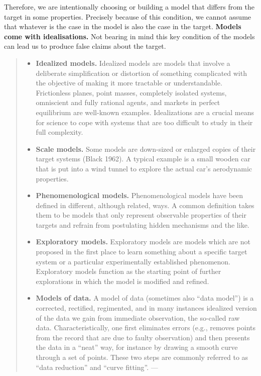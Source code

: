 \documentclass[
  12pt,
]{book}
\providecommand{\tightlist}{%
  \setlength{\itemsep}{0pt}\setlength{\parskip}{0pt}}
\begin{document}
Therefore, we are intentionally choosing or building a model that differs from the target in some properties. Precisely because of this condition, we cannot assume that whatever is the case in the model is also the case in the target. \textbf{Models come with idealisations.} Not bearing in mind this key condition of the models can lead us to produce false claims about the target.

\begin{quote}
\begin{itemize}
\tightlist
\item
  \textbf{Idealized models.} Idealized models are models that involve a deliberate simplification or distortion of something complicated with the objective of making it more tractable or understandable. Frictionless planes, point masses, completely isolated systems, omniscient and fully rational agents, and markets in perfect equilibrium are well-known examples. Idealizations are a crucial means for science to cope with systems that are too difficult to study in their full complexity.
\item
  \textbf{Scale models.} Some models are down-sized or enlarged copies of their target systems (Black 1962). A typical example is a small wooden car that is put into a wind tunnel to explore the actual car's aerodynamic properties.
\item
  \textbf{Phenomenological models.} Phenomenological models have been defined in different, although related, ways. A common definition takes them to be models that only represent observable properties of their targets and refrain from postulating hidden mechanisms and the like.
\item
  \textbf{Exploratory models.} Exploratory models are models which are not proposed in the first place to learn something about a specific target system or a particular experimentally established phenomenon. Exploratory models function as the starting point of further explorations in which the model is modified and refined.
\item
  \textbf{Models of data.} A model of data (sometimes also ``data model'') is a corrected, rectified, regimented, and in many instances idealized version of the data we gain from immediate observation, the so-called raw data. Characteristically, one first eliminates errors (e.g., removes points from the record that are due to faulty observation) and then presents the data in a ``neat'' way, for instance by drawing a smooth curve through a set of points. These two steps are commonly referred to as ``data reduction'' and ``curve fitting''. --- \citep{sep-models-science}
\end{itemize}
\end{quote}
\end{document}
